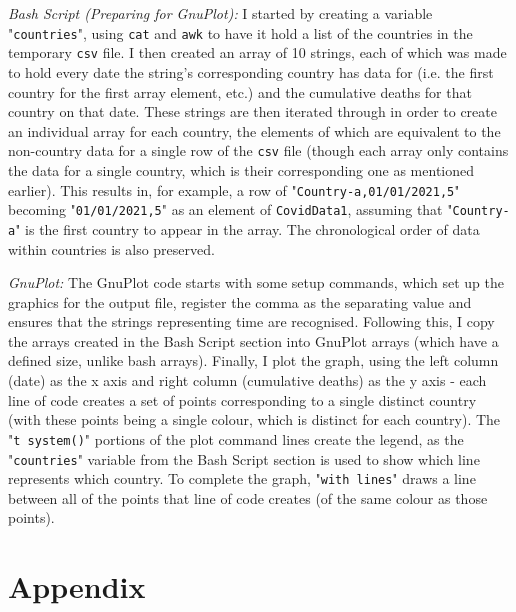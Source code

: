 \documentclass{article}
\begin{document}
\textit{Bash Script (Preparing for GnuPlot):}
I started by creating a variable "\verb|countries|", using \verb|cat| and \verb|awk| to have it hold a list of the countries in the temporary \verb|csv| file. I then created an array of 10 strings, each of which was made to hold every date the string's corresponding country has data for (i.e. the first country for the first array element, etc.) and the cumulative deaths for that country on that date. These strings are then iterated through in order to create an individual array for each country, the elements of which are equivalent to the non-country data for a single row of the \verb|csv| file (though each array only contains the data for a single country, which is their corresponding one as mentioned earlier). This results in, for example, a row of "\verb|Country-a,01/01/2021,5|" becoming "\verb|01/01/2021,5|" as an element of \verb|CovidData1|, assuming that "\verb|Country-a|" is the first country to appear in the array. The chronological order of data within countries is also preserved.\newline

\textit{GnuPlot:}
The GnuPlot code starts with some setup commands, which set up the graphics for the output file, register the comma as the separating value and ensures that the strings representing time are recognised. Following this, I copy the arrays created in the Bash Script section into GnuPlot arrays (which have a defined size, unlike bash arrays). Finally, I plot the graph, using the left column (date) as the x axis and right column (cumulative deaths) as the y axis - each line of code creates a set of points corresponding to a single distinct country (with these points being a single colour, which is distinct for each country). The "\verb|t system()|" portions of the plot command lines create the legend, as the "\verb|countries|" variable from the Bash Script section is used to show which line represents which country. To complete the graph, "\verb|with lines|" draws a line between all of the points that line of code creates (of the same colour as those points).

\newpage
\section{Appendix}
\end{document}
